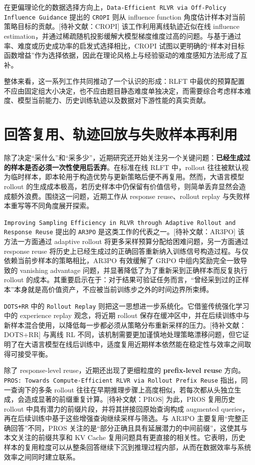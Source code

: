 在更偏理论化的数据选择方向上，\texttt{Data-Efficient RLVR via Off-Policy Influence Guidance} 提出的 \texttt{CROPI} 则从 influence function 角度估计样本对当前策略目标的贡献。[待补文献：CROPI] 该工作利用离线轨迹近似在线 influence estimation，并通过稀疏随机投影缓解大模型梯度维度过高的问题。与基于通过率、难度或历史成功率的启发式选择相比，CROPI 试图以更明确的“样本对目标函数增益”作为选择依据，因此在理论风格上与经验驱动的难度感知方法形成了互补。

整体来看，这一系列工作共同推动了一个认识的形成：RLFT 中最优的预算配置不应由固定组大小决定，也不应由题目静态难度单独决定，而需要综合考虑样本难度、模型当前能力、历史训练轨迹以及数据对下游性能的真实贡献。

\section{回答复用、轨迹回放与失败样本再利用}

除了决定“采什么”和“采多少”，近期研究还开始关注另一个关键问题：\textbf{已经生成过的样本是否必须一次性使用后丢弃}。在标准在线 RLFT 中，rollout 往往被默认视为临时样本，即本轮用于构造优势与更新策略后便不再复用。然而，大语言模型 rollout 的生成成本极高，若历史样本中仍保留有价值信号，则简单丢弃显然会造成额外浪费。围绕这一问题，近期工作从 response reuse、rollout replay 与失败样本重写等不同角度展开探索。

\texttt{Improving Sampling Efficiency in RLVR through Adaptive Rollout and Response Reuse} 提出的 \texttt{AR3PO} 是这类工作的代表之一。[待补文献：AR3PO] 该方法一方面通过 adaptive rollout 将更多采样预算分配给困难问题，另一方面通过 response reuse 将历史上已经生成过的正确回答重新纳入训练信号构造过程。与仅依赖当前步样本的策略相比，AR3PO 有效缓解了 GRPO 中组内奖励完全一致导致的 vanishing advantage 问题，并显著降低了为了重新采到正确样本而反复执行 rollout 的成本。其重要启示在于：对于结果可验证任务而言，“曾经采到过的正样本”本身就是高价值资产，不应被当前训练步之外的时间边界所束缚。

\texttt{DOTS+RR} 中的 \texttt{Rollout Replay} 则把这一思想进一步系统化。它借鉴传统强化学习中的 experience replay 观念，将近期 rollout 保存在缓冲区中，并在后续训练中与新样本混合使用，以降低每一步都必须从策略分布重新采样的压力。[待补文献：DOTS+RR] 与离线 RL 不同，该机制需要更加谨慎地处理策略漂移问题，但它证明了在大语言模型在线后训练中，适度复用近期样本依然能在稳定性与效率之间取得可接受平衡。

除了 response-level reuse，近期还出现了更细粒度的 \textbf{prefix-level reuse} 方向。\texttt{PROS: Towards Compute-Efficient RLVR via Rollout Prefix Reuse} 指出，同一查询下的多条 rollout 往往在早期推理步骤上高度相似，若每次都从头独立生成，会造成显著的前缀重复计算。[待补文献：PROS] 为此，PROS 复用历史 rollout 中具有潜力的前缀片段，并将其拼接回原始查询构成 augmented queries，再在后续训练中基于这些增强查询继续采样与筛选。与 AR3PO 主要复用“完整正确回答”不同，PROS 关注的是“部分正确且具有延展潜力的中间前缀”，这使其与本文关注的前缀共享和 KV Cache 复用问题具有更直接的相关性。它表明，历史样本的复用粒度可以从整条回答继续下沉到推理过程内部，从而在数据效率与系统效率之间同时建立联系。

